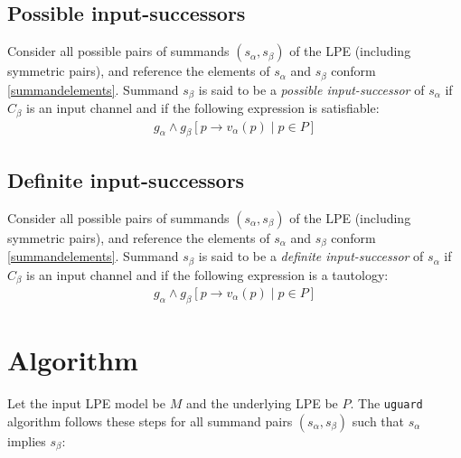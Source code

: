 \subsection{Possible input-successors}

Consider all possible pairs of summands $(s_\alpha, s_\beta)$ of the LPE (including symmetric pairs), and reference the elements of $s_\alpha$ and $s_\beta$ conform \ref{summandelements}.
Summand $s_\beta$ is said to be a \emph{possible input-successor} of $s_\alpha$ if $C_\beta$ is an input channel and if the following expression is satisfiable:
\begin{align*}
g_\alpha \land {g_\beta}[p \rightarrow v_\alpha(p) \;|\; p \in P]
\end{align*}

\subsection{Definite input-successors}

Consider all possible pairs of summands $(s_\alpha, s_\beta)$ of the LPE (including symmetric pairs), and reference the elements of $s_\alpha$ and $s_\beta$ conform \ref{summandelements}.
Summand $s_\beta$ is said to be a \emph{definite input-successor} of $s_\alpha$ if $C_\beta$ is an input channel and if the following expression is a tautology:
\begin{align*}
g_\alpha \land {g_\beta}[p \rightarrow v_\alpha(p) \;|\; p \in P]
\end{align*}

\section{Algorithm}

Let the input LPE model be $M$ and the underlying LPE be $P$.
The \texttt{uguard} algorithm follows these steps for all summand pairs $(s_\alpha, s_\beta)$ such that $s_\alpha$ implies $s_\beta$:

